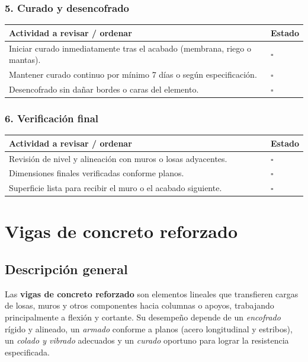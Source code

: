 \documentclass[12pt]{article}
\newcommand{\cbox}{\(\square\)} %
\begin{document}
	\subsubsection*{5. Curado y desencofrado}
	\begin{tabularx}{\linewidth}{>{\raggedright\arraybackslash}p{0.93\linewidth} >{\centering\arraybackslash}m{0.07\linewidth}}
		\toprule
		\textbf{Actividad a revisar / ordenar} & \textbf{Estado}\\
		\midrule
		Iniciar curado inmediatamente tras el acabado (membrana, riego o mantas). & \cbox \\
		Mantener curado continuo por mínimo 7 días o según especificación. & \cbox \\
		Desencofrado sin dañar bordes o caras del elemento. & \cbox \\
		\bottomrule
	\end{tabularx}
	
	\subsubsection*{6. Verificación final}
	\begin{tabularx}{\linewidth}{>{\raggedright\arraybackslash}p{0.93\linewidth} >{\centering\arraybackslash}m{0.07\linewidth}}
		\toprule
		\textbf{Actividad a revisar / ordenar} & \textbf{Estado}\\
		\midrule
		Revisión de nivel y alineación con muros o losas adyacentes. & \cbox \\
		Dimensiones finales verificadas conforme planos. & \cbox \\
		Superficie lista para recibir el muro o el acabado siguiente. & \cbox \\
		\bottomrule
	\end{tabularx}
	
	
	
	
	
	
	
	
	
	
	\section{Vigas de concreto reforzado}
	
	\subsection*{Descripción general}
	Las \textbf{vigas de concreto reforzado} son elementos lineales que transfieren cargas de losas, muros y otros componentes hacia columnas o apoyos, trabajando principalmente a flexión y cortante. Su desempeño depende de un \emph{encofrado} rígido y alineado, un \emph{armado} conforme a planos (acero longitudinal y estribos), un \emph{colado y vibrado} adecuados y un \emph{curado} oportuno para lograr la resistencia especificada.
	
\end{document}
